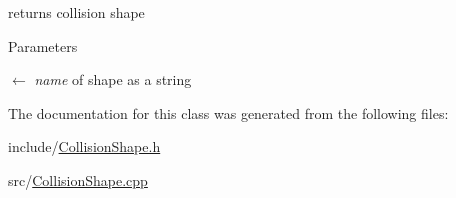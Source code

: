 returns collision shape 
\begin{DoxyParams}{Parameters}
\item[\mbox{$\leftarrow$} {\em name}]of shape as a string \end{DoxyParams}


The documentation for this class was generated from the following files:\begin{DoxyCompactItemize}
\item 
include/\hyperlink{CollisionShape_8h}{CollisionShape.h}\item 
src/\hyperlink{CollisionShape_8cpp}{CollisionShape.cpp}\end{DoxyCompactItemize}
